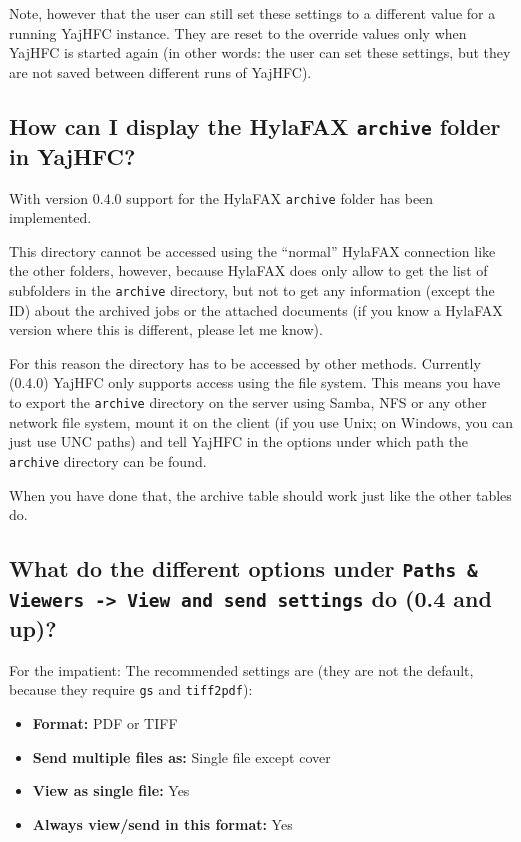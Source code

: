 \documentclass[a4paper,10pt]{scrartcl}
\begin{document}
Note, however that the user can still set these settings to a different value for a running YajHFC instance. They are reset to the override values only when YajHFC is started again (in other words: the user can set these settings, but they are not saved between different runs of YajHFC).


\subsection{How can I display the HylaFAX \texttt{archive} folder in YajHFC?}

With version 0.4.0 support for the HylaFAX \texttt{archive} folder has been implemented.

This directory cannot be accessed using the ``normal'' HylaFAX connection like the other folders, however, because HylaFAX does only allow to get the list of subfolders in the \texttt{archive} directory, but not to get any information (except the ID) about the archived jobs or the attached documents (if you know a HylaFAX version where this is different, please let me know).

For this reason the directory has to be accessed by other methods. Currently (0.4.0) YajHFC only supports access using the file system. This means you have to export the  \texttt{archive} directory on the server using Samba, NFS or any other network file system, mount it on the client (if you use Unix; on Windows, you can just use UNC paths) and tell YajHFC in the options under which path the \texttt{archive} directory can be found.

When you have done that, the archive table should work just like the other tables do.

\subsection{What do the different options under \texttt{Paths \& Viewers -> View and send settings} do (0.4 and up)?}

For the impatient: The recommended settings are (they are not the default, because they require \texttt{gs} and \texttt{tiff2pdf}):
\begin{itemize}
 \item \textbf{Format:} PDF or TIFF
 \item \textbf{Send multiple files as:} Single file except cover
 \item \textbf{View as single file:} Yes
 \item \textbf{Always view/send in this format:} Yes
\end{itemize}
\end{document}
